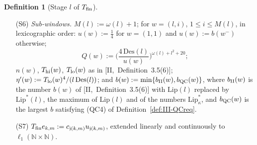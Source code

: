\documentclass[10pt]{amsart}
\theoremstyle{definition}
\newtheorem{definition}[theorem]{Definition}
\theoremstyle{remark}
\newcommand{\N}{\mathbb N}
\begin{document}
\begin{definition}[Stage $l$ of $T_{\rm fin}$]
\begin{enumerate}
every class $a$ of level $l$ (patterns range over the carriers $l''\le l$ and
their blocks), the rate objects of the floor-form cone
$\Gamma^\flat(\kappa,a)$ of Definition~\ref{def:III-cone}, whose aggregated
signature rows carry the $s$-free coefficients $\alpha_{l''}=\|v_{l''}
1_{S_{l''}\cap(l,\infty)}\|_1$; and the constants $\mathrm{Lip}^*_\kappa$, $C_L(\kappa)$, $N_L(\kappa)$, $m_0$,
$C_Y$, $\alpha_Y$, $c_\kappa$, $\beta_\kappa$, $h_\kappa$ of
Definition~\ref{def:III-QCreq}, computed with the actual weights
$c_1,\dots,c_l$; under option (b) only patterns with $1\notin\mathcal N_T(\kappa)$
are used.  $\omega(l)$ is the number of rate objects.  The \emph{design factor}
$\mathrm{Des}(l)$ is the design factor of [II,~Definition~3.5(5)] (with $B_\mu$),
multiplied at main stages by $4^{R_{\rm cl}(l)}2^{k(l+R_{\rm cl}(l))}
\underline y_l^{-1}$, by $\max_{\kappa}\max\{\mathrm{Lip}^*_\kappa,C_L(\kappa),
N_L(\kappa),C_Y,1/m_0,1/c_\kappa,\beta_\kappa,1/h_\kappa,1\}$ (with $1/\infty:=0$),
and by $\max_{l''\le l}n_{l''}2^{\sigma_2(l)}/(\mu_{\sigma_2(l)}^2\delta_{l''})$
\textup{(}condition (D-lev) of Definition~\ref{def:III-designadd} for the base
$\mu$\textup{)}.
\item[(S6)] \emph{Sub-windows.}  $M(l):=\omega(l)+1$; for $w=(l,i)$, $1\le i\le
M(l)$, in lexicographic order: $u(w):=\frac14$ for $w=(1,1)$ and $u(w):=b(w^-)$
otherwise;
\[
 Q(w):=\Big(\frac{4\,\mathrm{Des}(l)}{u(w)}\Big)^{\omega(l)+l^2+20};
\]
$n(w)$, $T_{\rm hi}(w)$, $T_{\rm lo}(w)$ as in [II,~Definition~3.5(6)];
$\eta'(w):=T_{\rm lo}(w)^4/(l\,\mathrm{Des}(l))$; and $b(w):=\min\{b_{\rm II}(w),
b_{\rm QC}(w)\}$, where $b_{\rm II}(w)$ is the number $b(w)$ of
[II,~Definition~3.5(6)] with $\mathrm{Lip}(l)$ replaced by $\mathrm{Lip}^*(l)$, the
maximum of $\mathrm{Lip}(l)$ and of the numbers $\mathrm{Lip}^*_\kappa$, and $b_{\rm QC}(w)$ is the
largest $b$ satisfying (QC4) of Definition~\ref{def:III-QCreq}.
\item[(S7)] $T_{\rm fin}e_{k,m}:=c_{\mathfrak j(k,m)}u_{\mathfrak j(k,m)}$, extended
linearly and continuously to $\ell_1(\N\times\N)$.
\end{enumerate}
\end{definition}
\end{document}
